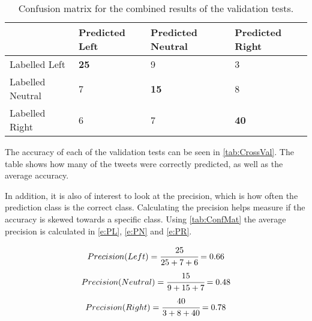 \begin{table}[H]
\centering
\begin{tabular}{l|l|l|l|}
\cline{2-4}
& Predicted Left & Predicted Neutral & Predicted Right \\ \hline 
\multicolumn{1}{|l|}{Labelled Left} & \textbf{25} & 9 & 3 \\ \hline
\multicolumn{1}{|l|}{Labelled Neutral} & 7 & \textbf{15} & 8  \\ \hline
\multicolumn{1}{|l|}{Labelled Right} & 6 & 7 & \textbf{40} \\ \hline
\end{tabular}
\caption{Confusion matrix for the combined results of the validation tests.}
\label{tab:ConfMat}
\end{table}

The accuracy of each of the validation tests can be seen in
\autoref{tab:CrossVal}. The table shows how many of the tweets were correctly
predicted, as well as the average accuracy.

\begin{table}[H]
\centering
{}
\caption{Accuracy for each of the cross validations.}
\label{tab:CrossVal}
\end{table}

In addition, it is also of interest to look at the precision, which is how often
the prediction class is the correct class. Calculating the precision helps
measure if the accuracy is skewed towards a specific class. Using
\autoref{tab:ConfMat} the average precision is calculated in \autoref{e:PL},
\autoref{e:PN} and \autoref{e:PR}.

\begin{equation}\label{e:PL}
Precision(Left) = \cfrac{25}{25+7+6} = 0.66
\end{equation}
\begin{equation}\label{e:PN}
Precision(Neutral) = \cfrac{15}{9+15+7} = 0.48
\end{equation}
\begin{equation}\label{e:PR}
Precision(Right) = \cfrac{40}{3+8+40} = 0.78
\end{equation}\nl

